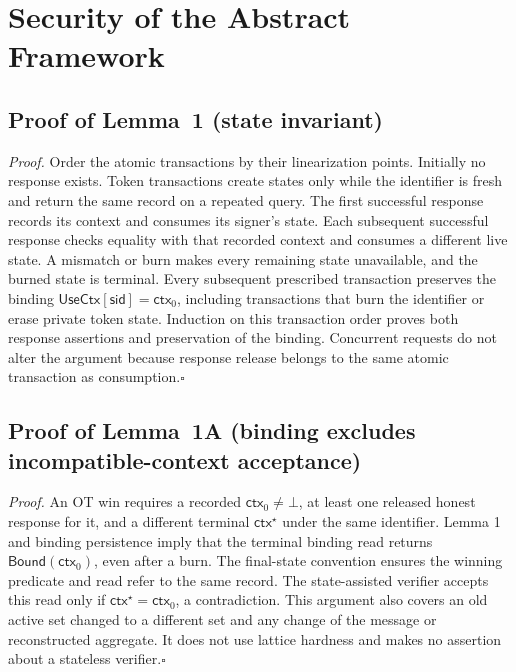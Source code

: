 \documentclass[lettersize,journal]{IEEEtran}
\begin{document}
	
	\appendices
	\section{Security of the Abstract Framework}
	
	\subsection{Proof of Lemma~1 (state invariant)}
	\label{app:proof-state-invariant}
	
	\emph{Proof.}
	Order the atomic transactions by their linearization points. Initially no
	response exists. Token transactions create states only while the identifier
	is fresh and return the same record on a repeated query. The first
	successful response records its context and consumes its signer's state.
	Each subsequent successful response checks equality with that recorded
	context and consumes a different live state. A mismatch or burn makes every
	remaining state unavailable, and the burned state is terminal. Every subsequent
	prescribed transaction preserves the binding
	$\mathsf{UseCtx}[\mathsf{sid}]=\mathsf{ctx}_0$, including transactions
	that burn the identifier or erase private token state.
	Induction on this transaction order proves both response assertions
	and preservation of the binding. Concurrent requests do not
	alter the argument because response release belongs to the same atomic
	transaction as consumption.\hfill$\square$
	
	\subsection{Proof of Lemma~1A (binding excludes incompatible-context acceptance)}
	\label{app:proof-context-binding}
	
	\emph{Proof.}
	An OT win requires a recorded $\mathsf{ctx}_0\ne\bot$, at least one released
	honest response for it, and a different terminal $\mathsf{ctx}^{\star}$
	under the same identifier. Lemma 1 and binding persistence imply that the
	terminal binding read returns $\mathsf{Bound}(\mathsf{ctx}_0)$, even after
	a burn. The final-state convention ensures the winning predicate and read
	refer to the same record. The state-assisted verifier accepts this read only if
	$\mathsf{ctx}^{\star}=\mathsf{ctx}_0$, a contradiction. This argument also
	covers an old active set changed to a different set and any change of the
	message or reconstructed aggregate. It does not use lattice hardness and
	makes no assertion about a stateless verifier.\hfill$\square$
	
\end{document}
